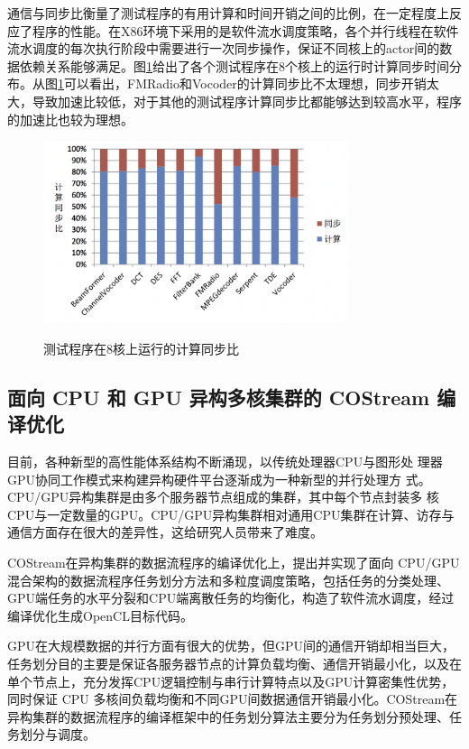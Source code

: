 通信与同步比衡量了测试程序的有用计算和时间开销之间的比例，在一定程度上反应了程序的性能。在X86环境下采用的是软件流水调度策略，各个并行线程在软件流水调度的每次执行阶段中需要进行一次同步操作，保证不同核上的actor间的数据依赖关系能够满足。图\ref{fig:x86computeSync}给出了各个测试程序在8个核上的运行时计算同步时间分布。从图\ref{fig:x86computeSync}可以看出，FMRadio和Vocoder的计算同步比不太理想，同步开销太大，导致加速比较低，对于其他的测试程序计算同步比都能够达到较高水平，程序的加速比也较为理想。

\begin{figure}[htbp]
  \centering
  \includegraphics[width=0.8\textwidth]{Img/Chap_Application/Yu/x86computeSync.png}\\
  \caption{测试程序在8核上运行的计算同步比}\label{fig:x86computeSync}
\end{figure}

\subsection{面向 CPU 和 GPU 异构多核集群的 COStream 编译优化}

目前，各种新型的高性能体系结构不断涌现，以传统处理器CPU与图形处 理器GPU协同工作模式来构建异构硬件平台逐渐成为一种新型的并行处理方 式。CPU/GPU异构集群是由多个服务器节点组成的集群，其中每个节点封装多 核CPU与一定数量的GPU。CPU/GPU异构集群相对通用CPU集群在计算、访存与通信方面存在很大的差异性，这给研究人员带来了难度。 

COStream在异构集群的数据流程序的编译优化上，提出并实现了面向 CPU/GPU混合架构的数据流程序任务划分方法和多粒度调度策略，包括任务的分类处理、GPU端任务的水平分裂和CPU端离散任务的均衡化，构造了软件流水调度，经过编译优化生成OpenCL目标代码。

GPU在大规模数据的并行方面有很大的优势，但GPU间的通信开销却相当巨大，任务划分目的主要是保证各服务器节点的计算负载均衡、通信开销最小化，以及在单个节点上，充分发挥CPU逻辑控制与串行计算特点以及GPU计算密集性优势，同时保证 CPU 多核间负载均衡和不同GPU间数据通信开销最小化。COStream在异构集群的数据流程序的编译框架中的任务划分算法主要分为任务划分预处理、任务划分与调度。

